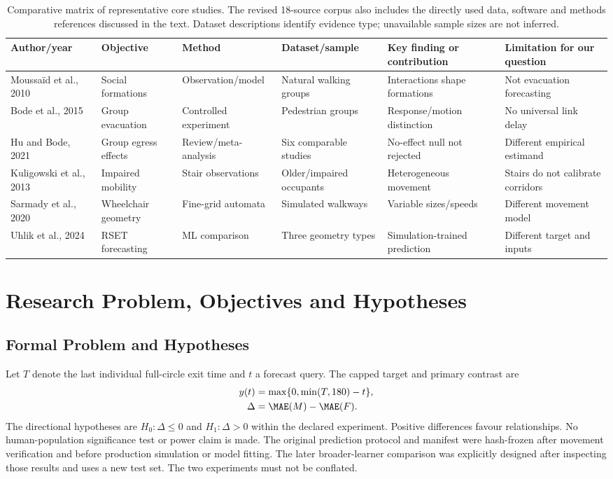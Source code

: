\begin{table}[!t]\centering\footnotesize
\caption{Comparative matrix of representative core studies. The revised 18-source corpus also includes the directly used data, software and methods references discussed in the text. Dataset descriptions identify evidence type; unavailable sample sizes are not inferred.}
\label{tab:literature}
\begin{tabularx}{\textwidth}{p{2.2cm}XXXXX}\toprule
Author/year & Objective & Method & Dataset/sample & Key finding or contribution & Limitation for our question\\\midrule
Moussa\"id et al., 2010 \cite{r1} & Social formations & Observation/model & Natural walking groups & Interactions shape formations & Not evacuation forecasting\\
Bode et al., 2015 \cite{r2} & Group evacuation & Controlled experiment & Pedestrian groups & Response/motion distinction & No universal link delay\\
Hu and Bode, 2021 \cite{L17} & Group egress effects & Review/meta-analysis & Six comparable studies & No-effect null not rejected & Different empirical estimand\\
Kuligowski et al., 2013 \cite{L08} & Impaired mobility & Stair observations & Older/impaired occupants & Heterogeneous movement & Stairs do not calibrate corridors\\
Sarmady et al., 2020 \cite{r3} & Wheelchair geometry & Fine-grid automata & Simulated walkways & Variable sizes/speeds & Different movement model\\
Uhlik et al., 2024 \cite{r5} & RSET forecasting & ML comparison & Three geometry types & Simulation-trained prediction & Different target and inputs\\\bottomrule
\end{tabularx}
\end{table}

\section{Research Problem, Objectives and Hypotheses}
\subsection{Formal Problem and Hypotheses}
Let $T$ denote the last individual full-circle exit time and $t$ a forecast query. The capped target and primary contrast are
\begin{align}
y(t)&=\max\{0,\min(T,180)-t\},\\
\Delta&=\MAE(M)-\MAE(F).
\end{align}
The directional hypotheses are $H_0:\Delta\leq0$ and $H_1:\Delta>0$ within the declared experiment. Positive differences favour relationships. No human-population significance test or power claim is made. The original prediction protocol and manifest were hash-frozen after movement verification and before production simulation or model fitting. The later broader-learner comparison was explicitly designed after inspecting those results and uses a new test set. The two experiments must not be conflated.

